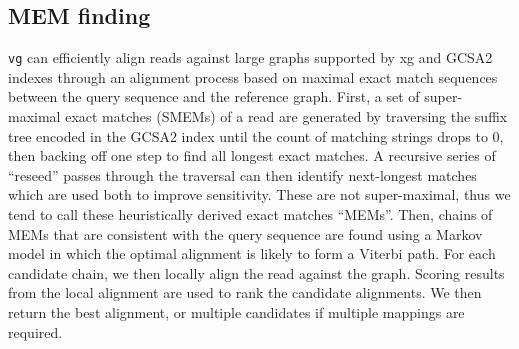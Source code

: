\subsection{MEM finding}
{\tt vg} can efficiently align reads against large graphs supported by xg and GCSA2 indexes through an alignment process based on maximal exact match sequences between the query sequence and the reference graph.
First, a set of super-maximal exact matches (SMEMs) of a read are generated by traversing the suffix tree encoded in the GCSA2 index until the count of matching strings drops to 0, then backing off one step to find all longest exact matches. 
A recursive series of ``reseed'' passes through the traversal can then identify next-longest matches which are used both to improve sensitivity.
These are not super-maximal, thus we tend to call these heuristically derived exact matches ``MEMs''.
Then, chains of MEMs that are consistent with the query sequence are found using a Markov model in which the optimal alignment is likely to form a Viterbi path.
For each candidate chain, we then locally align the read against the graph. 
Scoring results from the local alignment are used to rank the candidate alignments.
We then return the best alignment, or multiple candidates if multiple mappings are required.

